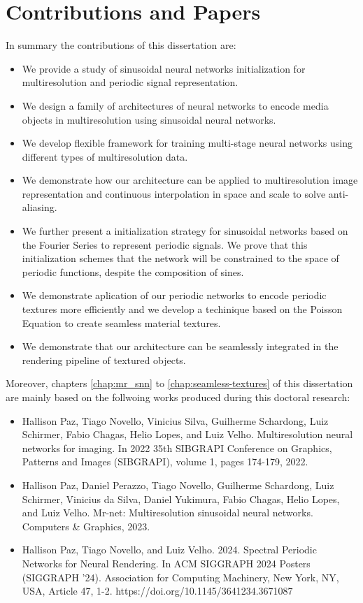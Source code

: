\section{Contributions and Papers}

In summary the contributions of this dissertation are:

\begin{itemize}
    \item We provide a study of sinusoidal neural networks initialization for multiresolution and periodic signal representation.
    \item We design a family of architectures of neural networks to encode media objects in multiresolution using sinusoidal neural networks.
    \item We develop flexible framework for training multi-stage neural networks using different types of multiresolution data.
    \item We demonstrate how our architecture can be applied to multiresolution image representation and continuous interpolation in space and scale to solve anti-aliasing.
    \item We further present a initialization strategy for sinusoidal networks based on the Fourier Series to represent periodic signals. We prove that this initialization schemes that the network will be constrained to the space of periodic functions, despite the composition of sines. 
    \item We demonstrate aplication of our periodic networks to encode periodic textures more efficiently and we develop a techinique based on the Poisson Equation to create seamless material textures.
    \item We demonstrate that our architecture can be seamlessly integrated in the  rendering pipeline of textured objects.
\end{itemize}

Moreover, chapters \ref{chap:mr_snn} to \ref{chap:seamless-textures} of this dissertation are mainly based on the follwoing works produced during this doctoral research:

\begin{itemize}
    \item Hallison Paz, Tiago Novello, Vinicius Silva, Guilherme Schardong, Luiz Schirmer, Fabio Chagas, Helio Lopes, and Luiz Velho. Multiresolution neural networks for imaging. In 2022 35th SIBGRAPI Conference on Graphics, Patterns and Images (SIBGRAPI), volume 1, pages 174-179, 2022. 
    \item Hallison Paz, Daniel Perazzo, Tiago Novello, Guilherme Schardong, Luiz Schirmer, Vinicius da Silva, Daniel Yukimura, Fabio Chagas, Helio Lopes, and Luiz Velho. Mr-net: Multiresolution sinusoidal neural networks. Computers \& Graphics, 2023.
    \item Hallison Paz, Tiago Novello, and Luiz Velho. 2024. Spectral Periodic Networks for Neural Rendering. In ACM SIGGRAPH 2024 Posters (SIGGRAPH '24). Association for Computing Machinery, New York, NY, USA, Article 47, 1-2. https://doi.org/10.1145/3641234.3671087
\end{itemize}


